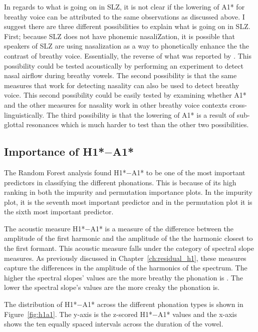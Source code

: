 In regards to what is going on in SLZ, it is not clear if the lowering of A1* for breathy voice can be attributed to the same observations as discussed above. I suggest there are three different possibilities to explain what is going on in SLZ. First; because SLZ does not have phonemic nasaliZation, it is possible that speakers of SLZ are using nasalization as a way to phonetically enhance the the contrast of breathy voice. Essentially, the reverse of what was reported by \citet{garellekBreathyVoiceNasality2016}. This possibility could be tested acoustically by performing an experiment to detect nasal airflow during breathy vowels. The second possibility is that the same measures that work for detecting nasality can also be used to detect breathy voice. This second possibility could be easily tested by examining whether A1* and the other measures for nasality work in other breathy voice contexts cross-linguistically. The third possibility is that the lowering of A1* is a result of sub-glottal resonances which is much harder to test than the other two possibilities. 

\subsection{Importance of \texorpdfstring{H1*$-$A1*}{H1*-A1*}} \label{sec:h1a1_discussion}

The Random Forest analysis found H1*$-$A1* to be one of the most important predictors in classifying the different phonations. This is because of its high ranking in both the impurity and permutation importance plots. In the impurity plot, it is the seventh most important predictor and in the permutation plot it is the sixth most important predictor.

The acoustic measure H1*$-$A1* is a measure of the difference between the amplitude of the first harmonic and the amplitude of the the harmonic closest to the first formant. This acoustic measure falls under the category of spectral slope measures. As previously discussed in Chapter~\ref{ch:residual_h1}, these measures capture the differences in the amplitude of the harmonics of the spectrum. The higher the spectral slopes' values are the more breathy the phonation is \citep{fischer-jorgensenPhoneticAnalysisBreathy1968}. The lower the spectral slope's values are the more creaky the phonation is.

The distribution of H1*$-$A1* across the different phonation types is shown in Figure~\ref{fig:h1a1}. The y-axis is the z-scored H1*$-$A1* values and the x-axis shows the ten equally spaced intervals across the duration of the vowel. 

